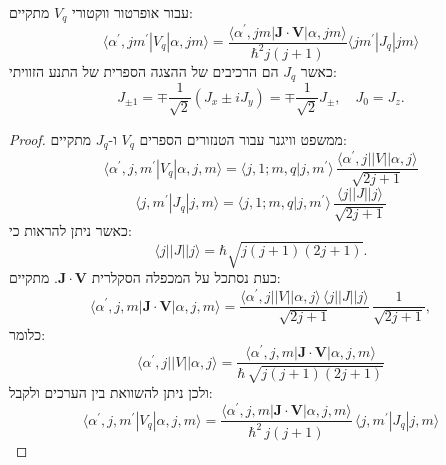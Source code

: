 \documentclass{tstextbook}
\begin{document}
\begin{corollary}
עבור אופרטור ווקטורי \(V_{q}\) מתקיים:
$$\langle\alpha^{\prime},j m^{\prime}|V_{q}|\alpha,j m\rangle=\frac{\langle\alpha^{\prime},j m|\mathbf{J}\cdot\mathbf{V}|\alpha,j m\rangle}{\hbar^{2}j(j+1)}\langle j m^{\prime}|J_{q}|j m\rangle$$
כאשר \(J_{q}\) הם הרכיבים של ההצגה הספרית של התנע הזוויתי:
$$J_{\pm1}=\mp\frac{1}{\sqrt{2}}(J_{x}\pm i J_{y})=\mp\frac{1}{\sqrt{2}}J_{\pm},\quad J_{0}=J_{z}.$$

\end{corollary}
\begin{proof}
ממשפט וויגנר עבור הטנזורים הספרים \(V_{q}\) ו-\(J_{q}\) מתקיים:
$$\langle\alpha^{\prime},j,m^{\prime}|V_{q}|\alpha,j,m\rangle=\langle j,1;m,q|j,m^{\prime}\rangle\,\frac{\langle\alpha^{\prime},j||V||\alpha,j\rangle}{\sqrt{2j+1}}$$$$\langle j,m^{\prime}|J_{q}|j,m\rangle=\langle j,1;m,q|j,m^{\prime}\rangle\,\frac{\langle j||J||j\rangle}{\sqrt{2j+1}}$$
כאשר ניתן להראות כי:
$$\langle j||J||j\rangle=\hbar\sqrt{j(j+1)(2j+1)}.$$
כעת נסתכל על המכפלה הסקלרית \(\mathbf{J}\cdot \mathbf{V}\). מתקיים:
$$\langle\alpha^{\prime},j,m|\mathbf{J}\cdot\mathbf{V}|\alpha,j,m\rangle={\frac{\langle\alpha^{\prime},j||V||\alpha,j\rangle\,\langle j||J||j\rangle}{\sqrt{2j+1}}}\,{\frac{1}{\sqrt{2j+1}}},$$
כלומר:
$$\langle\alpha^{\prime},j||V||\alpha,j\rangle=\frac{\langle\alpha^{\prime},j,m|\mathbf{J}\cdot\mathbf{V}|\alpha,j,m\rangle}{\hbar\,\sqrt{j(j+1)(2j+1)}}$$
ולכן ניתן להשוואת בין הערכים ולקבל:
$$\langle\alpha^{\prime},j,m^{\prime}|V_{q}|\alpha,j,m\rangle=\frac{\langle\alpha^{\prime},j,m|\mathbf{J}\cdot\mathbf{V}|\alpha,j,m\rangle}{\hbar^{2}\,j(j+1)}\,\langle j,m^{\prime}|J_{q}|j,m\rangle$$

\end{proof}
\end{document}
